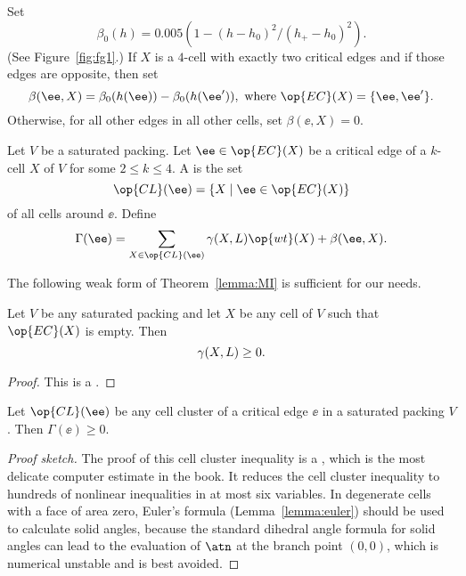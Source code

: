 \begin{cnl}
\begin{definition}
\label{def:beta} 
%
Set 
\[  
\beta_0(h) = 0.005 (1 - (h-h_0)^2/(h_+-h_0)^2).
\] 
 (See Figure~\ref{fig:fg1}.) 
If $X$ is a $4$-cell with exactly two critical edges and if those
edges are opposite, then set
\[  
\beta(\ee,X) = \beta_0(h(\ee)) - \beta_0(h(\ee')), 
\text{ where }\op{EC}(X) = \braced{\ee,\ee'} .  
\] 
Otherwise, for all other edges in all other cells, set $\beta(\ee,X) = 0$.
\end{definition}


\figPQFEXQN %


\begin{definition}
\label{def:gammaL} 
%
Let $V$ be a saturated packing.  Let $\ee\in \op{EC}(X)$ be a critical
edge of a $k$-cell $X$ of $V$ for some $2\le k\le 4$.  A  is the set
\[  
\op{CL}(\ee) = \setcomp{X}{ \ee\in \op{EC}(X)} 
\] 
%
of all cells around $\ee$. 
Define
\[  
\Gamma(\ee) = \sumfinitepred{X}{X\in \op{CL}(\ee)} {\gammaX(X,L) \op{wt}(X) +\beta(\ee,X)}.
\] 
\end{definition}


The following weak form of Theorem~\ref{lemma:MI} is sufficient
for our needs.

\begin{lemma}
\label{lemma:LI} 
%
Let $V$ be any saturated packing and let $X$ be any cell of $V$ such
that $\op{EC}(X)$ is empty.  Then
\[
\gamma(X,L)\ge 0.
\]
\end{lemma}

\begin{proof} This is a .
\end{proof}


\begin{theorem}
\label{lemma:cluster}
%
Let $\op{CL}(\ee)$ be any cell cluster of a critical edge $\ee$ in a
saturated packing $V$.  Then $\Gamma(\ee)\ge 0$.
\end{theorem}

\begin{proof}[Proof sketch]
  The proof of this cell cluster inequality is a , which
  is the most delicate computer estimate in the book.  It 
  reduces the cell cluster inequality to hundreds of nonlinear
  inequalities in at most six variables.  In degenerate cells with a
  face of area zero, Euler's formula (Lemma~\ref{lemma:euler}) should
  be used to calculate solid angles, because the standard dihedral angle
  formula for solid angles can lead to the evaluation of $\atn$ at the
  branch point $(0,0)$, which is numerical unstable and is best
  avoided.
\end{proof}


\end{cnl}
